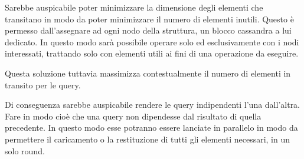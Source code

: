 		Sarebbe auspicabile poter minimizzare la dimensione degli elementi che transitano in modo da poter minimizzare il numero di elementi inutili. Questo è permesso dall'assegnare ad ogni nodo della struttura, un blocco cassandra a lui dedicato. In questo modo sarà possibile operare solo ed esclusivamente con i nodi interessati, trattando solo con elementi utili ai fini di una operazione da eseguire.		
				
		Questa soluzione tuttavia massimizza contestualmente il numero di elementi in transito per le query.
		
		Di conseguenza sarebbe auspicabile rendere le query indipendenti l'una dall'altra. Fare in modo cioè che una query non dipendesse dal risultato di quella precedente. In questo modo esse potranno essere lanciate in parallelo in modo da permettere il caricamento o la restituzione di tutti gli elementi necessari, in un solo round.
		
